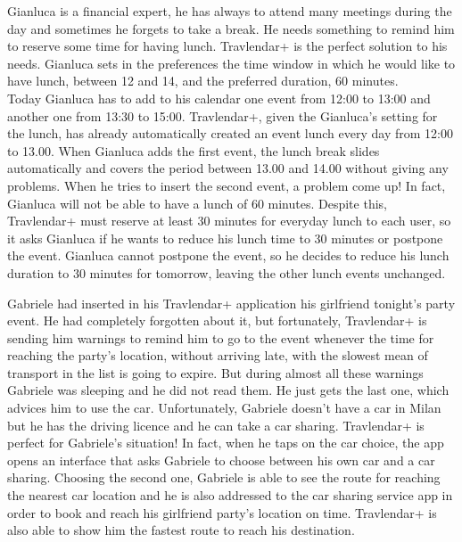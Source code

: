 Gianluca is a financial expert, he has always to attend many meetings during the day and sometimes he forgets to take a break. He needs something to remind him to reserve some time for having lunch. Travlendar+ is the perfect solution to his needs. Gianluca sets in the preferences the time window in which he would like to have lunch, between 12 and 14, and the preferred duration, 60 minutes.\\
Today Gianluca has to add to his calendar one event from 12:00 to 13:00 and another one from 13:30 to 15:00. Travlendar+, given the Gianluca’s setting for the lunch, has already automatically created an event lunch every day from 12:00 to 13.00. When Gianluca adds the first event, the lunch break slides automatically and covers the period between 13.00 and 14.00 without giving any problems. When he tries to insert the second event, a problem come up! In fact, Gianluca will not be able to have a lunch of 60 minutes. Despite this, Travlendar+ must reserve at least 30 minutes for everyday lunch to each user, so it asks Gianluca if he wants to reduce his lunch time to 30 minutes or postpone the event. Gianluca cannot postpone the event, so he decides to reduce his lunch duration to 30 minutes for tomorrow, leaving the other lunch events unchanged.

\newpage
{}
Gabriele had inserted in his Travlendar+ application his girlfriend tonight’s party event. He had completely forgotten about it, but fortunately, Travlendar+ is sending him warnings to remind him to go to the event whenever the time for reaching the party’s location, without arriving late, with the slowest mean of transport in the list is going to expire. But during almost all these warnings Gabriele was sleeping and he did not read them. He just gets the last one, which advices him to use the car. Unfortunately, Gabriele doesn’t have a car in Milan but he has the driving licence and he can take a car sharing. Travlendar+ is perfect for Gabriele’s situation! In fact, when he taps on the car choice, the app opens an interface that asks Gabriele to choose between his own car and a car sharing. Choosing the second one, Gabriele is able to see the route for reaching the nearest car location and he is also addressed to the car sharing service app in order to book and reach his girlfriend party’s location on time. Travlendar+ is also able to show him the fastest route to reach his destination.

